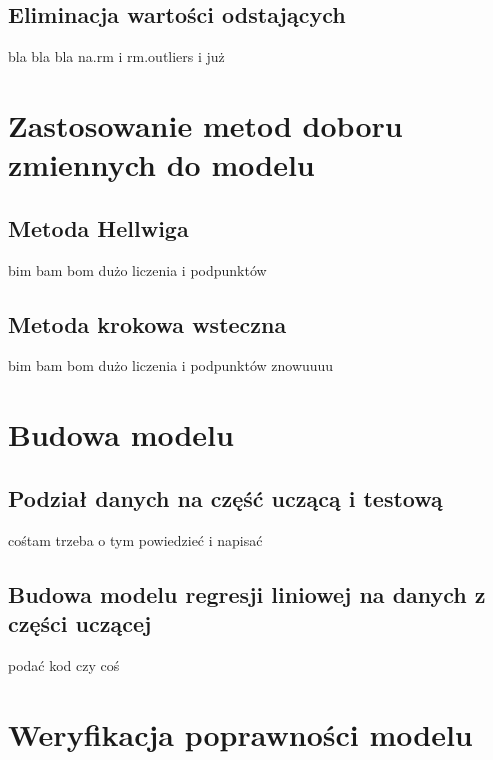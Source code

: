 \documentclass[
  11pt,
]{article}
\begin{document}
\subsection{Eliminacja wartości
odstających}\label{eliminacja-wartoux15bci-odstajux105cych}

bla bla bla na.rm i rm.outliers i już

\section{Zastosowanie metod doboru zmiennych do
modelu}\label{zastosowanie-metod-doboru-zmiennych-do-modelu}

\subsection{Metoda Hellwiga}\label{metoda-hellwiga}

bim bam bom dużo liczenia i podpunktów

\subsection{Metoda krokowa wsteczna}\label{metoda-krokowa-wsteczna}

bim bam bom dużo liczenia i podpunktów znowuuuu

\section{Budowa modelu}\label{budowa-modelu}

\subsection{Podział danych na część uczącą i
testową}\label{podziaux142-danych-na-czux119ux15bux107-uczux105cux105-i-testowux105}

cośtam trzeba o tym powiedzieć i napisać

\subsection{Budowa modelu regresji liniowej na danych z części
uczącej}\label{budowa-modelu-regresji-liniowej-na-danych-z-czux119ux15bci-uczux105cej}

podać kod czy coś

\section{Weryfikacja poprawności
modelu}\label{weryfikacja-poprawnoux15bci-modelu}
\end{document}
